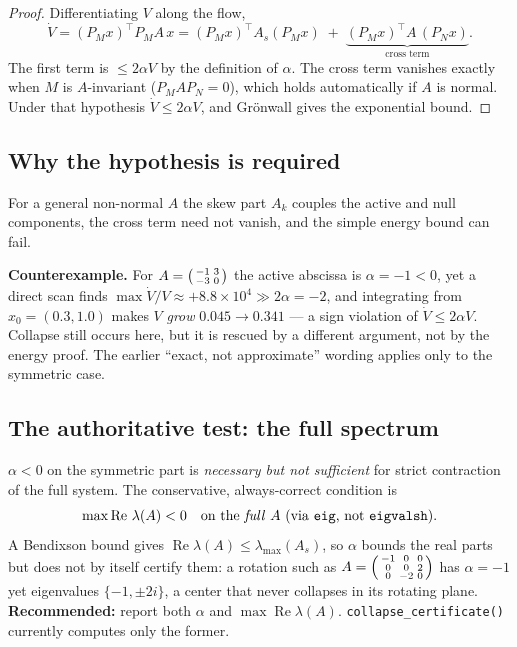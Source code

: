 \documentclass[11pt]{article}
\theoremstyle{definition}
\newcommand{\PM}{P_{\!M}}
\newcommand{\PN}{P_{\!N}}
\DeclareMathOperator*{\Real}{Re}
\begin{document}
\begin{proof}
Differentiating $V$ along the flow,
\[
\dot V = (\PM x)^{\top}\PM A\,x
= (\PM x)^{\top} A_s (\PM x)
\;+\; \underbrace{(\PM x)^{\top} A\,(\PN x)}_{\text{cross term}}.
\]
The first term is $\le 2\alpha V$ by the definition of $\alpha$. The cross term
vanishes exactly when $M$ is $A$-invariant ($\PM A \PN = 0$), which holds
automatically if $A$ is normal. Under that hypothesis $\dot V \le 2\alpha V$, and
Gr\"onwall gives the exponential bound.
\end{proof}

\subsection{Why the hypothesis is required}
For a general non-normal $A$ the skew part $A_k$ couples the active and null
components, the cross term need not vanish, and the simple energy bound can fail.

\begin{caveatbox}
\textbf{Counterexample.} For $A=\begin{psmallmatrix}-1 & 3\\ -3 & 0\end{psmallmatrix}$
the active abscissa is $\alpha=-1<0$, yet a direct scan finds
$\max \dot V/V \approx +8.8\times10^{4} \gg 2\alpha=-2$, and integrating from
$x_0=(0.3,1.0)$ makes $V$ \emph{grow} $0.045\to0.341$ --- a sign violation of
$\dot V\le 2\alpha V$. Collapse still occurs here, but it is rescued by a different
argument, not by the energy proof. The earlier ``exact, not approximate'' wording
applies only to the symmetric case.
\end{caveatbox}

\subsection{The authoritative test: the full spectrum}
$\alpha<0$ on the symmetric part is \emph{necessary but not sufficient} for strict
contraction of the full system. The conservative, always-correct condition is
\begin{equation}
\max \Real\,\lambda(A) < 0 \quad\text{on the \emph{full} } A
\ (\text{via \texttt{eig}, not \texttt{eigvalsh}}).
\end{equation}
A Bendixson bound gives $\Real\lambda(A)\le\lambda_{\max}(A_s)$, so $\alpha$ bounds
the real parts but does not by itself certify them: a rotation such as
$A=\begin{psmallmatrix}-1&0&0\\0&0&2\\0&-2&0\end{psmallmatrix}$ has $\alpha=-1$ yet
eigenvalues $\{-1,\pm 2i\}$, a center that never collapses in its rotating plane.
\textbf{Recommended:} report both $\alpha$ and $\max\Real\lambda(A)$.
\texttt{collapse\_certificate()} currently computes only the former.
\end{document}

